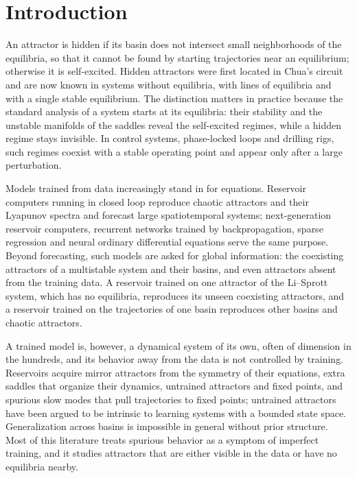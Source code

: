 \section{Introduction}
\label{sec:intro}

An attractor is hidden if its basin does not intersect small neighborhoods of the equilibria, so that it cannot be found
by starting trajectories near an equilibrium; otherwise it is self-excited.\cite{LeonovKuznetsov2013,Dudkowski2016} Hidden
attractors were first located in Chua's circuit\cite{Leonov2011PLA} and are now known in systems without equilibria, with
lines of equilibria and with a single stable equilibrium.\cite{Dudkowski2016,Molaie2013,JafariSprott2013,WangChen2012} The
distinction matters in practice because the standard analysis of a system starts at its equilibria: their stability and
the unstable manifolds of the saddles reveal the self-excited regimes, while a hidden regime stays invisible. In control
systems, phase-locked loops and drilling rigs, such regimes coexist with a stable operating point and appear only after a
large perturbation.\cite{Kuznetsov2020JCSSI}

Models trained from data increasingly stand in for equations. Reservoir computers running in closed loop reproduce chaotic
attractors and their Lyapunov spectra\cite{JaegerHaas2004,Pathak2017Chaos,LuHuntOtt2018} and forecast large spatiotemporal
systems;\cite{Pathak2018PRL} next-generation reservoir computers,\cite{Gauthier2021NGRC} recurrent networks trained by
backpropagation,\cite{Vlachas2020Backprop} sparse regression\cite{Brunton2016SINDy} and neural ordinary differential
equations\cite{Chen2018NeuralODE} serve the same purpose. Beyond forecasting, such models are asked for global information:
the coexisting attractors of a multistable system and their basins,\cite{Roy2022Multistability,Liu2025HiddenDynamics} and
even attractors absent from the training data. A reservoir trained on one attractor of the Li--Sprott system, which has no
equilibria, reproduces its unseen coexisting attractors,\cite{Rohm2021,Rohm2022Unseen} and a reservoir trained on the
trajectories of one basin reproduces other basins and chaotic attractors.\cite{Norton2025Unseen}

A trained model is, however, a dynamical system of its own, often of dimension in the hundreds, and its behavior away from
the data is not controlled by training. Reservoirs acquire mirror attractors from the symmetry of their
equations,\cite{HerteuxRath2020} extra saddles that organize their dynamics,\cite{Kabayama2025PseudoLorenz} untrained
attractors and fixed points,\cite{Flynn2021,Hart2024CLE,Norton2025Unseen} and spurious slow modes that pull trajectories to
fixed points;\cite{Oishi2026FastSlow} untrained attractors have been argued to be intrinsic to learning systems with a
bounded state space.\cite{OHagan2025Confabulation} Generalization across basins is impossible in general without prior
structure.\cite{Goring2024OOD} Most of this literature treats spurious behavior as a symptom of imperfect training, and it
studies attractors that are either visible in the data or have no equilibria nearby.

